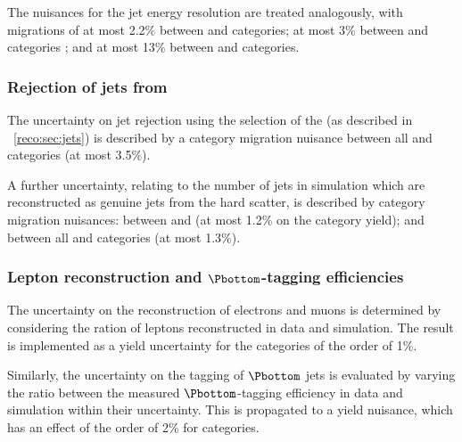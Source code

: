 The nuisances for the jet energy resolution are treated analogously, with migrations of at most 2.2\% between  and  categories; at most 3\% between \VBF and \Untagged categories ; and at most 13\% between \TTHTag and \Untagged categories.

\subsubsection{Rejection of jets from \PU}
The uncertainty on \PU jet rejection using the selection of the \RMS (as described in \Sec~\ref{reco:sec:jets}) is described by a category migration nuisance between all \VBF and \Untagged categories (at most 3.5\%).

A further uncertainty, relating to the number of \PU jets in simulation which are reconstructed as genuine jets from the hard scatter, is described by category migration nuisances: between  and  (at most 1.2\% on the category yield); and between all \VBF and \Untagged categories (at most 1.3\%).

\subsubsection{Lepton reconstruction and $\Pbottom$-tagging efficiencies}
The uncertainty on the reconstruction of electrons and muons is determined by considering the ration of leptons reconstructed in data and simulation. The result is implemented as a yield uncertainty for the \TTHTag categories of the order of 1\%.

Similarly, the uncertainty on the tagging of $\Pbottom$ jets is evaluated by varying the ratio between the measured $\Pbottom$-tagging efficiency in data and simulation within their uncertainty. This is propagated to a yield nuisance, which has an effect of the order of 2\% for \TTHTag categories.


